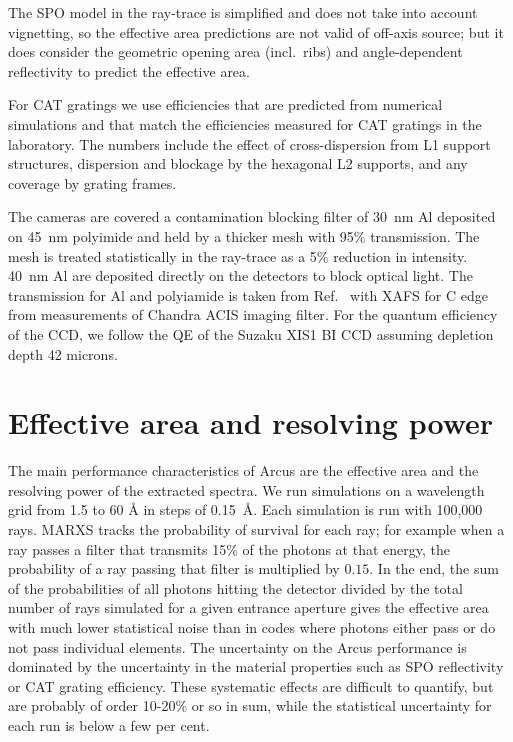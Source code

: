 \documentclass[12pt]{spieman}  %
\begin{document}
\begin{spacing}{1}
The SPO model in the ray-trace is simplified and does not take into account vignetting, so the effective area predictions are not valid of off-axis source; but it does consider the geometric opening area (incl.\ ribs) and angle-dependent reflectivity to predict the effective area.

For CAT gratings we use efficiencies that are predicted from numerical simulations and that match the efficiencies measured for CAT gratings in the laboratory. The numbers include the effect of cross-dispersion from L1 support structures, dispersion and blockage by the hexagonal L2 supports, and any coverage by grating frames.


The cameras are covered a contamination blocking filter of 30~nm Al deposited on 45~nm polyimide and held by a thicker mesh with 95\% transmission. The mesh is treated statistically in the ray-trace as a 5\% reduction in intensity. 40~nm Al are deposited directly on the detectors to block optical light. The transmission for Al and polyiamide is taken from Ref.~ with XAFS for C edge from measurements of Chandra ACIS imaging filter\cite{10.1117/12.245111}.
For the quantum efficiency of the CCD, we follow the QE of the Suzaku XIS1 BI CCD assuming depletion depth 42 microns\cite{2007PASJ...59S..23K}.




\section{Effective area and resolving power}
The main performance characteristics of Arcus are the effective area and the resolving power of the extracted spectra. We run simulations on a wavelength grid from 1.5 to 60 \AA{} in steps of 0.15~\AA{}. Each simulation is run with 100,000 rays. MARXS tracks the probability of survival for each ray; for example when a ray passes a filter that transmits 15\% of the photons at that energy, the probability of a ray passing that filter is multiplied by $0.15$. In the end, the sum of the probabilities of all photons hitting the detector divided by the total number of rays simulated for a given entrance aperture gives the effective area with much lower statistical noise than in codes where photons either pass or do not pass individual elements. The uncertainty on the Arcus performance is dominated by the uncertainty in the material properties such as SPO reflectivity or CAT grating efficiency. These systematic effects are difficult to quantify, but are probably of order 10-20\% or so in sum, while the statistical uncertainty for each run is below a few per cent.


\end{spacing}
\end{document}
